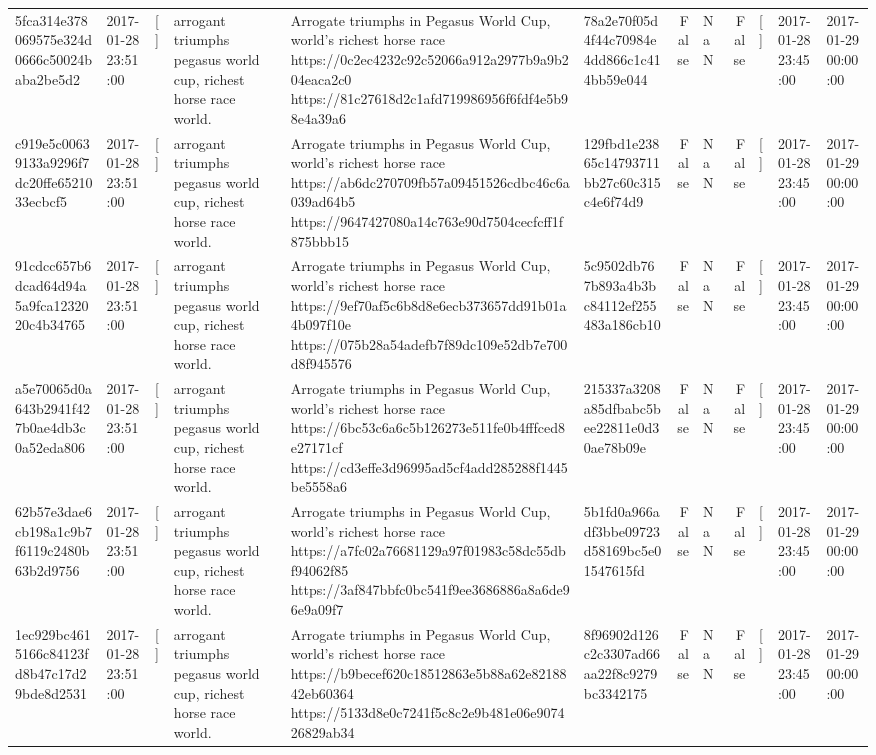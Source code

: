 \begin{tabular}{llllllrlrlll}
5fca314e378069575e324d0666c50024baba2be5d2 & 2017-01-28 23:51:00 & [] & arrogant triumphs pegasus world cup, richest horse race world. & Arrogate triumphs in Pegasus World Cup, world's richest horse race https://0c2ec4232c92c52066a912a2977b9a9b204eaca2c0 https://81c27618d2c1afd719986956f6fdf4e5b98e4a39a6 & 78a2e70f05d4f44c70984e4dd866c1c414bb59e044 & False & NaN & False & [] & 2017-01-28 23:45:00 & 2017-01-29 00:00:00 \\
c919e5c00639133a9296f7dc20ffe6521033ecbcf5 & 2017-01-28 23:51:00 & [] & arrogant triumphs pegasus world cup, richest horse race world. & Arrogate triumphs in Pegasus World Cup, world's richest horse race https://ab6dc270709fb57a09451526cdbc46c6a039ad64b5 https://9647427080a14c763e90d7504cecfcff1f875bbb15 & 129fbd1e23865c14793711bb27c60c315c4e6f74d9 & False & NaN & False & [] & 2017-01-28 23:45:00 & 2017-01-29 00:00:00 \\
91cdcc657b6dcad64d94a5a9fca1232020c4b34765 & 2017-01-28 23:51:00 & [] & arrogant triumphs pegasus world cup, richest horse race world. & Arrogate triumphs in Pegasus World Cup, world's richest horse race https://9ef70af5c6b8d8e6ecb373657dd91b01a4b097f10e https://075b28a54adefb7f89dc109e52db7e700d8f945576 & 5c9502db767b893a4b3bc84112ef255483a186cb10 & False & NaN & False & [] & 2017-01-28 23:45:00 & 2017-01-29 00:00:00 \\
a5e70065d0a643b2941f427b0ae4db3c0a52eda806 & 2017-01-28 23:51:00 & [] & arrogant triumphs pegasus world cup, richest horse race world. & Arrogate triumphs in Pegasus World Cup, world's richest horse race https://6bc53c6a6c5b126273e511fe0b4fffced8e27171cf https://cd3effe3d96995ad5cf4add285288f1445be5558a6 & 215337a3208a85dfbabc5bee22811e0d30ae78b09e & False & NaN & False & [] & 2017-01-28 23:45:00 & 2017-01-29 00:00:00 \\
62b57e3dae6cb198a1c9b7f6119c2480b63b2d9756 & 2017-01-28 23:51:00 & [] & arrogant triumphs pegasus world cup, richest horse race world. & Arrogate triumphs in Pegasus World Cup, world's richest horse race https://a7fc02a76681129a97f01983c58dc55dbf94062f85 https://3af847bbfc0bc541f9ee3686886a8a6de96e9a09f7 & 5b1fd0a966adf3bbe09723d58169bc5e01547615fd & False & NaN & False & [] & 2017-01-28 23:45:00 & 2017-01-29 00:00:00 \\
1ec929bc4615166c84123fd8b47c17d29bde8d2531 & 2017-01-28 23:51:00 & [] & arrogant triumphs pegasus world cup, richest horse race world. & Arrogate triumphs in Pegasus World Cup, world's richest horse race https://b9becef620c18512863e5b88a62e8218842eb60364 https://5133d8e0c7241f5c8c2e9b481e06e907426829ab34 & 8f96902d126c2c3307ad66aa22f8c9279bc3342175 & False & NaN & False & [] & 2017-01-28 23:45:00 & 2017-01-29 00:00:00 \\

\end{tabular}
